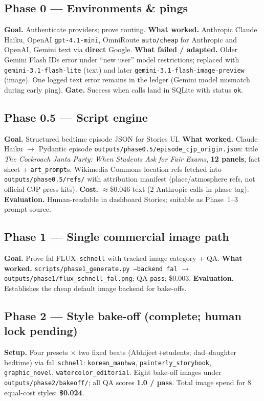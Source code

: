 \documentclass[10pt,twocolumn,letterpaper]{article}
\begin{document}
\subsection{Phase 0 --- Environments \& pings}
\textbf{Goal.} Authenticate providers; prove routing.
\textbf{What worked.} Anthropic Claude Haiku, OpenAI \texttt{gpt-4.1-mini}, OmniRoute \texttt{auto/cheap} for Anthropic and OpenAI, Gemini text via \textbf{direct} Google.
\textbf{What failed / adapted.} Older Gemini Flash IDs error under ``new user'' model restrictions; replaced with \texttt{gemini-3.1-flash-lite} (text) and later \texttt{gemini-3.1-flash-image-preview} (image).
One logged text error remains in the ledger (Gemini model mismatch during early ping).
\textbf{Gate.} Success when calls land in SQLite with status \texttt{ok}.

\subsection{Phase 0.5 --- Script engine}
\textbf{Goal.} Structured bedtime episode JSON for Stories UI.
\textbf{What worked.} Claude Haiku $\rightarrow$ Pydantic episode \texttt{outputs/phase0.5/episode\_cjp\_origin.json}: title \emph{The Cockroach Janta Party: When Students Ask for Fair Exams}, \textbf{12 panels}, fact sheet + \texttt{art\_prompt}s.
Wikimedia Commons location refs fetched into \texttt{outputs/phase0.5/refs/} with attribution manifest (place/atmosphere refs, not official CJP press kits).
\textbf{Cost.} $\approx$\$0.046 text (2 Anthropic calls in phase tag).
\textbf{Evaluation.} Human-readable in dashboard Stories; suitable as Phase~1--3 prompt source.

\subsection{Phase 1 --- Single commercial image path}
\textbf{Goal.} Prove fal FLUX~\texttt{schnell} with tracked image category + QA.
\textbf{What worked.} \texttt{scripts/phase1\_generate.py --backend fal} $\rightarrow$ \texttt{outputs/phase1/flux\_schnell\_fal.png}; QA \texttt{pass}; \$0.003.
\textbf{Evaluation.} Establishes the cheap default image backend for bake-offs.

\subsection{Phase 2 --- Style bake-off (complete; human lock pending)}
\textbf{Setup.} Four presets $\times$ two fixed beats (Abhijeet+students; dad--daughter bedtime) via fal~\texttt{schnell}:
\texttt{korean\_manhwa}, \texttt{painterly\_storybook}, \texttt{graphic\_novel}, \texttt{watercolor\_editorial}.
Eight bake-off images under \texttt{outputs/phase2/bakeoff/}; all QA scores \textbf{1.0 / pass}. Total image spend for 8 equal-cost styles: \textbf{\$0.024}.
\end{document}
